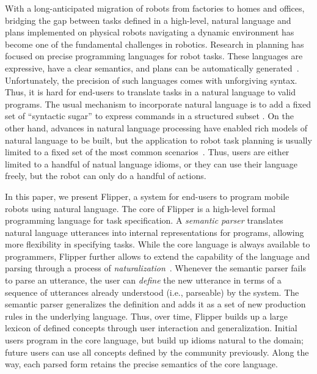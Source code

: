 \documentclass[letterpaper, 10 pt, conference]{ieeeconf}  %
\newcommand{\tool}{Flipper\xspace}
\begin{document}
With a long-anticipated migration of robots from factories to homes and offices, bridging
the gap between tasks defined in a high-level, natural language and plans
implemented on physical robots navigating a dynamic environment has become one
of the fundamental challenges in robotics.
%
Research in planning has focused on precise programming languages for robot tasks.
These languages are expressive, have a clear semantics,
and plans can be automatically generated~\cite{golog, strips, pddl,fainekosTemporalLogicMotionPlanning,hoffmanFF,ankushDrona}.
Unfortunately, the precision of such languages comes with unforgiving syntax.
Thus, it is hard for end-users to translate tasks in a natural language to valid programs.
The usual mechanism to incorporate natural language is to add a fixed set of ``syntactic sugar'' to express
commands in a structured subset \cite{hadasTranslatingStructuredEnglish}.
On the other hand, advances in natural language processing have enabled rich models of natural
language to be built, but the application to robot task planning is usually
limited to a fixed set of the most common scenarios~\cite{hadasProvablyCorrectReactiveControlFromNaturalLanguage,thomasonDialog,kollarDialog}.
Thus, users are either limited to a handful of natual language idioms,
or they can use their language freely, but the robot can only do a handful of actions.

In this paper, we present \tool, a system for end-users to program mobile robots using natural language.
The core of \tool is a high-level formal programming language for task specification.
A \emph{semantic parser} \cite{berantSempre} translates natural language utterances into internal representations for programs,
allowing more flexibility in specifying tasks.
While the core language is always available to programmers,
\tool further allows to extend the capability of the language and parsing through a
process of \emph{naturalization}~\cite{wangVoxelurn}.
Whenever the semantic parser fails to parse an utterance, the user can \emph{define} the
new utterance in terms of a sequence of utterances already understood (i.e., parseable) by the system.
The semantic parser generalizes the definition and adds it as a set of new production rules in the underlying language.
Thus, over time, \tool builds up a large lexicon of defined concepts through user interaction and generalization.
Initial users program in the core language, but build up idioms natural to the domain; future users
can use all concepts defined by the community previously.
Along the way, each parsed form retains the precise semantics of the core language.
\end{document}
